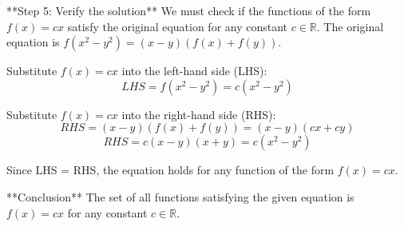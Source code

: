 **Step 5: Verify the solution**
We must check if the functions of the form $f(x)=cx$ satisfy the original equation for any constant $c \in \mathbb{R}$.
The original equation is $f(x^2 - y^2) = (x-y)(f(x) + f(y))$.

Substitute $f(x)=cx$ into the left-hand side (LHS):
$$LHS = f(x^2 - y^2) = c(x^2 - y^2)$$

Substitute $f(x)=cx$ into the right-hand side (RHS):
$$RHS = (x-y)(f(x) + f(y)) = (x-y)(cx + cy)$$
$$RHS = c(x-y)(x+y) = c(x^2 - y^2)$$

Since LHS = RHS, the equation holds for any function of the form $f(x)=cx$.

**Conclusion**
The set of all functions satisfying the given equation is $f(x) = cx$ for any constant $c \in \mathbb{R}$.